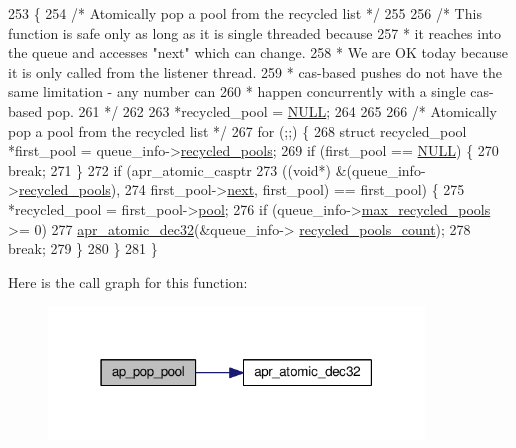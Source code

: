 \begin{DoxyCode}
253 \{
254     \textcolor{comment}{/* Atomically pop a pool from the recycled list */}
255 
256     \textcolor{comment}{/* This function is safe only as long as it is single threaded because}
257 \textcolor{comment}{     * it reaches into the queue and accesses "next" which can change.}
258 \textcolor{comment}{     * We are OK today because it is only called from the listener thread.}
259 \textcolor{comment}{     * cas-based pushes do not have the same limitation - any number can}
260 \textcolor{comment}{     * happen concurrently with a single cas-based pop.}
261 \textcolor{comment}{     */}
262 
263     *recycled\_pool = \hyperlink{pcre_8txt_ad7f989d16aa8ca809a36bc392c07fba1}{NULL};
264 
265 
266     \textcolor{comment}{/* Atomically pop a pool from the recycled list */}
267     \textcolor{keywordflow}{for} (;;) \{
268         \textcolor{keyword}{struct }recycled\_pool *first\_pool = queue\_info->\hyperlink{structfd__queue__info__t_ac4e7511417ba04c774bf0576cba54dc2}{recycled\_pools};
269         \textcolor{keywordflow}{if} (first\_pool == \hyperlink{pcre_8txt_ad7f989d16aa8ca809a36bc392c07fba1}{NULL}) \{
270             \textcolor{keywordflow}{break};
271         \}
272         \textcolor{keywordflow}{if} (apr\_atomic\_casptr
273             ((\textcolor{keywordtype}{void}*) &(queue\_info->\hyperlink{structfd__queue__info__t_ac4e7511417ba04c774bf0576cba54dc2}{recycled\_pools}),
274              first\_pool->\hyperlink{structrecycled__pool_a6c607a84f541b580419d94ec5313c25a}{next}, first\_pool) == first\_pool) \{
275             *recycled\_pool = first\_pool->\hyperlink{structrecycled__pool_a7a9db88b8ae2ec367708d457b29e7d22}{pool};
276             \textcolor{keywordflow}{if} (queue\_info->\hyperlink{structfd__queue__info__t_ac83918a33f9efbcb3c79ca208358d5f3}{max\_recycled\_pools} >= 0)
277                 \hyperlink{atomic_8c_a7a8d16335fdcd27f2baca90df35ad300}{apr\_atomic\_dec32}(&queue\_info->
      \hyperlink{structfd__queue__info__t_af10c530322499a45a7ceff4dee6047e0}{recycled\_pools\_count});
278             \textcolor{keywordflow}{break};
279         \}
280     \}
281 \}
\end{DoxyCode}


Here is the call graph for this function\+:
\nopagebreak
\begin{figure}[H]
\begin{center}
\leavevmode
\includegraphics[width=283pt]{group__APACHE__MPM__EVENT_ga2981ac69bfcc972dab0211a57cf15730_cgraph}
\end{center}
\end{figure}




